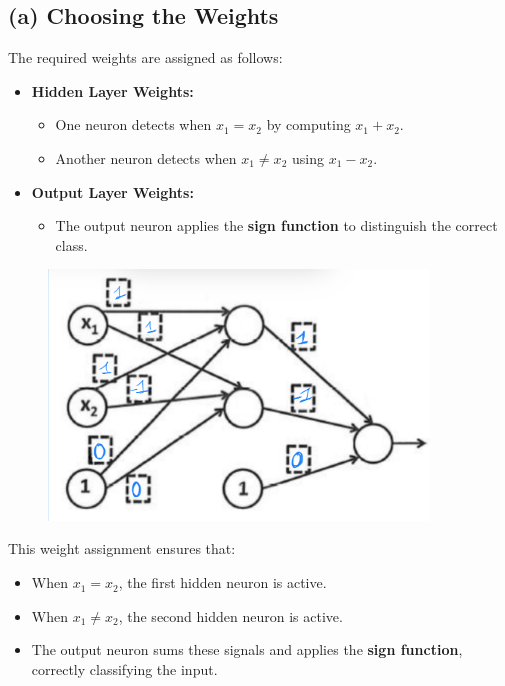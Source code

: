 \documentclass[a4paper,11pt,oneside]{book}
\begin{document}
\begin{enumerate}
\begin{solution}
                \subsection*{(a) Choosing the Weights}
                The required weights are assigned as follows:
                \begin{itemize}
                    \item \textbf{Hidden Layer Weights:}
                    \begin{itemize}
                        \item One neuron detects when $x_1 = x_2$ by computing $x_1 + x_2$.
                        \item Another neuron detects when $x_1 \neq x_2$ using $x_1 - x_2$.
                    \end{itemize}
                    \item \textbf{Output Layer Weights:}
                    \begin{itemize}
                        \item The output neuron applies the \textbf{sign function} to distinguish the correct class.
                    \end{itemize}
                \end{itemize}

                \begin{figure}[H]
                    \centering
                    \includegraphics[width=0.9\textwidth,height=0.9\textheight,keepaspectratio]{images/2_4_31_Jan_2023.jpeg}
                \end{figure}
                
                This weight assignment ensures that:
                \begin{itemize}
                    \item When $x_1 = x_2$, the first hidden neuron is active.
                    \item When $x_1 \neq x_2$, the second hidden neuron is active.
                    \item The output neuron sums these signals and applies the \textbf{sign function}, correctly classifying the input.
                \end{itemize}
                

\end{solution}
\end{enumerate}
\end{document}
